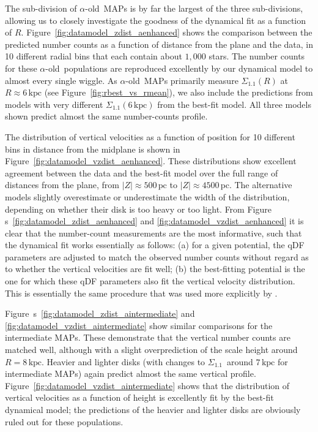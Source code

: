 \documentclass{emulateapj}
\renewcommand{\figurename}{Figure}
\newcommand{\figurenames}{\figurename~s}
\newcommand{\aenhanced}{\ensuremath{\alpha}-old}
\newcommand{\map}{MAP}
\newcommand{\kpc}{\ensuremath{\,\mathrm{kpc}}}
\newcommand{\pc}{\ensuremath{\,\mathrm{pc}}}
\newcommand{\sigoneone}{\ensuremath{\Sigma_{1.1}}}
\begin{document}
The sub-division of \aenhanced\ \map s is by far the largest of the
three sub-divisions, allowing us to closely investigate the goodness
of the dynamical fit as a function of
$R$. \figurename~\ref{fig:datamodel_zdist_aenhanced} shows the
comparison between the predicted number counts as a function of
distance from the plane and the data, in 10 different radial bins that
each contain about $1,000$ stars. The number counts for these
\aenhanced\ populations are reproduced excellently by our dynamical
model to almost every single wiggle. As \aenhanced\ \map s primarily
measure $\sigoneone(R)$ at $R \approx6\kpc$ (see
\figurename~\ref{fig:rbest_vs_rmean}), we also include the predictions
from models with very different $\sigoneone(6\kpc)$ from the best-fit
model. All three models shown predict almost the same number-counts
profile.

The distribution of vertical velocities as a function of position for
10 different bins in distance from the midplane is shown in
\figurename~\ref{fig:datamodel_vzdist_aenhanced}. These distributions
show excellent agreement between the data and the best-fit model over
the full range of distances from the plane, from $|Z| \approx500\pc$ to
$|Z| \approx4500\pc$. The alternative models slightly overestimate or
underestimate the width of the distribution, depending on whether
their disk is too heavy or too light. From \figurename
s~\ref{fig:datamodel_zdist_aenhanced} and
\ref{fig:datamodel_vzdist_aenhanced} it is clear that the number-count
measurements are the most informative, such that the dynamical fit
works essentially as follows: (a) for a given potential, the qDF
parameters are adjusted to match the observed number counts without
regard as to whether the vertical velocities are fit well; (b) the
best-fitting potential is the one for which these qDF parameters also
fit the vertical velocity distribution. This is essentially the same
procedure that was used more explicitly by \citet{Kuijken89a}.

\figurenames~\ref{fig:datamodel_zdist_aintermediate} and
\ref{fig:datamodel_vzdist_aintermediate} show similar comparisons for
the intermediate \map s. These demonstrate that the vertical number
counts are matched well, although with a slight overprediction of the
scale height around $R = 8\kpc$. Heavier and lighter disks (with
changes to \sigoneone\ around $7\kpc$ for intermediate \map s) again
predict almost the same vertical
profile. \figurename~\ref{fig:datamodel_vzdist_aintermediate} shows
that the distribution of vertical velocities as a function of height
is excellently fit by the best-fit dynamical model; the predictions of
the heavier and lighter disks are obviously ruled out for these
populations.
\end{document}
